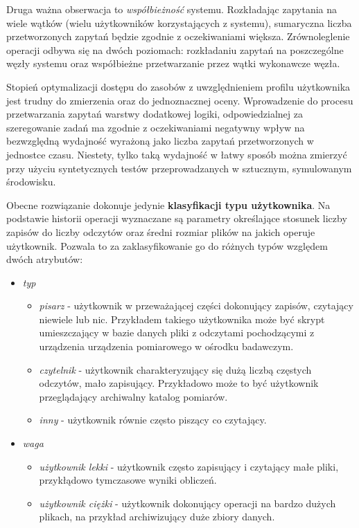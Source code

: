 Druga ważna obserwacja to \textit{współbieżność} systemu. Rozkładając zapytania na wiele wątków (wielu użytkowników korzystających z systemu), sumaryczna liczba przetworzonych zapytań będzie zgodnie z oczekiwaniami większa. Zrównoleglenie operacji odbywa się na dwóch poziomach: rozkładaniu zapytań na poszczególne węzły systemu oraz współbieżne przetwarzanie przez wątki wykonawcze węzła.

Stopień optymalizacji dostępu do zasobów z uwzględnieniem profilu użytkownika jest trudny do zmierzenia oraz do jednoznacznej oceny. Wprowadzenie do procesu przetwarzania zapytań warstwy dodatkowej logiki, odpowiedzialnej za szeregowanie zadań ma zgodnie z oczekiwaniami negatywny wpływ na bezwzględną wydajność wyrażoną jako liczba zapytań przetworzonych w jednostce czasu. Niestety, tylko taką wydajność w łatwy sposób można zmierzyć przy użyciu syntetycznych testów przeprowadzanych w sztucznym, symulowanym środowisku.

Obecne rozwiązanie dokonuje jedynie \textbf{klasyfikacji typu użytkownika}. Na podstawie historii operacji wyznaczane są parametry określające stosunek liczby zapisów do liczby odczytów oraz średni rozmiar plików na jakich operuje użytkownik. Pozwala to za zaklasyfikowanie go do różnych typów względem dwóch atrybutów:
\begin{itemize}
	\item \textit{typ}
	\begin{itemize}
		\item \textit{pisarz} - użytkownik  w przeważającej części dokonujący zapisów, czytający niewiele lub nic. Przykładem takiego użytkownika może być skrypt umieszczający w bazie danych pliki z odczytami pochodzącymi z urządzenia urządzenia pomiarowego w ośrodku badawczym.
		\item \textit{czytelnik} - użytkownik charakteryzujący się dużą liczbą częstych odczytów, mało zapisujący. Przykładowo może to być użytkownik przeglądający archiwalny katalog pomiarów.
		\item \textit{inny} - użytkownik równie często piszący co czytający.
	\end{itemize}
	\item \textit{waga}
	\begin{itemize}
		\item \textit{użytkownik lekki} - użytkownik często zapisujący i czytający małe pliki, przykłądowo tymczasowe wyniki obliczeń.
		\item \textit{użytkownik ciężki} - użytkownik dokonujący operacji na bardzo dużych plikach, na przykład archiwizujący duże zbiory danych.
	\end{itemize}
\end{itemize}

